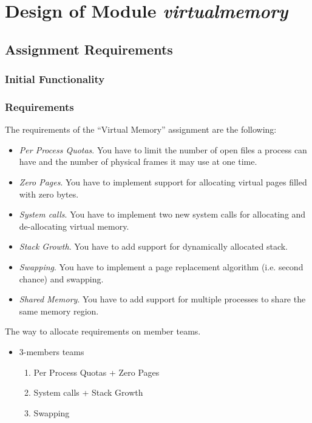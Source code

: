 
\chapter{Design of Module \textit{virtualmemory}}

\section{Assignment Requirements}


\subsection{Initial Functionality}


\subsection{Requirements}

The requirements of the ``Virtual Memory'' assignment are the following:
\begin{itemize}
    \item \textit{Per Process Quotas}. You have to limit the number of open files a process can have
and the number of physical frames it may use at one time.

    \item \textit{Zero Pages}. You have to implement support for allocating virtual pages filled with
zero bytes.

    \item \textit{System calls}. You have to implement two new system calls for allocating and
de-allocating virtual memory.

		\item \textit{Stack Growth}. You have to add support for dynamically allocated stack.

    \item \textit{Swapping}. You have to implement a page replacement algorithm (i.e. second chance)
and swapping.

		\item \textit{Shared Memory}. You have to add support for multiple processes to share the same memory region.

\end{itemize}


The way to allocate requirements on member teams. 
\begin{itemize}
    \item 3-members teams
        \begin{enumerate}
            \item Per Process Quotas + Zero Pages
            \item System calls + Stack Growth
            \item Swapping
        \end{enumerate}
\end{itemize}

